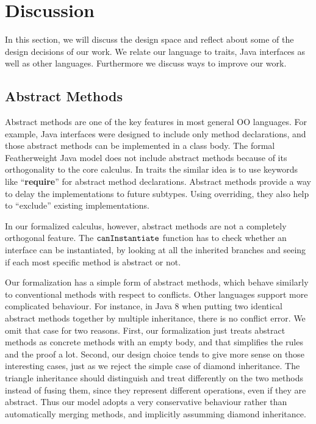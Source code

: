 \section{Discussion}
In this section, we will discuss the design space and reflect about some of the design decisions of our work. We relate 
our language to traits, Java interfaces as well as other languages. Furthermore we discuss
ways to improve our  work.

\subsection{Abstract Methods}

Abstract methods are one of the key features in most general OO languages. For example, Java interfaces were designed
to include only method declarations, and those abstract methods can be implemented in a class body. 
The formal Featherweight Java model does not include abstract methods because of its orthogonality to the core calculus. In traits the
similar idea is to use keywords like ``\textbf{require}'' for abstract method declarations. Abstract methods provide a way to
delay the implementations to future subtypes. Using overriding, they also help to ``exclude'' existing implementations.

In our formalized calculus, however, abstract methods are not a completely orthogonal feature. The $\texttt{canInstantiate}$ function
has to check whether an interface can be instantiated, by looking at all the inherited branches and seeing if each most specific method
is abstract or not.

Our formalization has a simple form of abstract methods, which behave similarly to conventional methods with respect to conflicts.
Other languages support more complicated behaviour.
For instance, in Java 8 when putting two identical abstract methods together by multiple inheritance, there is no conflict error. We omit
that case for two reasons. First, our formalization just treats abstract methods as concrete methods with an empty body, and that simplifies
the rules and the proof a lot. Second, our design choice tends to give more sense on those interesting cases, just as we reject the simple case of diamond inheritance. The triangle inheritance should distinguish and treat differently on the two methods instead of fusing them, since they represent different operations, even if they are abstract. Thus our model adopts a very conservative behaviour rather than automatically merging 
methods, and implicitly assumming diamond inheritance.

